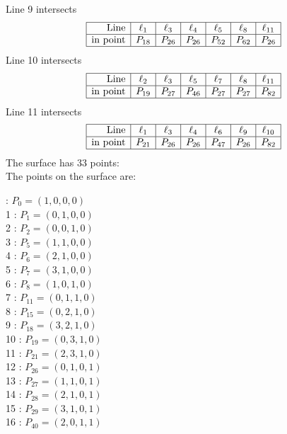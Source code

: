 \documentclass{article}
\begin{document}
{$$$$
Line 9 intersects 
$$
\begin{array}{|r*{6}{|c}|}
\hline
\mbox{Line}  & \ell_{1} & \ell_{3} & \ell_{4} & \ell_{5} & \ell_{8} & \ell_{11}\\
\hline
\mbox{in point}  & P_{18} & P_{26} & P_{26} & P_{52} & P_{62} & P_{26}\\
\hline
\end{array}
$$
Line 10 intersects 
$$
\begin{array}{|r*{6}{|c}|}
\hline
\mbox{Line}  & \ell_{2} & \ell_{3} & \ell_{5} & \ell_{7} & \ell_{8} & \ell_{11}\\
\hline
\mbox{in point}  & P_{19} & P_{27} & P_{46} & P_{27} & P_{27} & P_{82}\\
\hline
\end{array}
$$
Line 11 intersects 
$$
\begin{array}{|r*{6}{|c}|}
\hline
\mbox{Line}  & \ell_{1} & \ell_{3} & \ell_{4} & \ell_{6} & \ell_{9} & \ell_{10}\\
\hline
\mbox{in point}  & P_{21} & P_{26} & P_{26} & P_{47} & P_{26} & P_{82}\\
\hline
\end{array}
$$
The surface has 33 points:\\
The points on the surface are:\\
\begin{multicols}{3}
 : $P_{0}=( 1, 0, 0, 0 )$\\
1 : $P_{1}=( 0, 1, 0, 0 )$\\
2 : $P_{2}=( 0, 0, 1, 0 )$\\
3 : $P_{5}=( 1, 1, 0, 0 )$\\
4 : $P_{6}=( 2, 1, 0, 0 )$\\
5 : $P_{7}=( 3, 1, 0, 0 )$\\
6 : $P_{8}=( 1, 0, 1, 0 )$\\
7 : $P_{11}=( 0, 1, 1, 0 )$\\
8 : $P_{15}=( 0, 2, 1, 0 )$\\
9 : $P_{18}=( 3, 2, 1, 0 )$\\
10 : $P_{19}=( 0, 3, 1, 0 )$\\
11 : $P_{21}=( 2, 3, 1, 0 )$\\
12 : $P_{26}=( 0, 1, 0, 1 )$\\
13 : $P_{27}=( 1, 1, 0, 1 )$\\
14 : $P_{28}=( 2, 1, 0, 1 )$\\
15 : $P_{29}=( 3, 1, 0, 1 )$\\
16 : $P_{40}=( 2, 0, 1, 1 )$\\

\end{multicols}}
\end{document}

